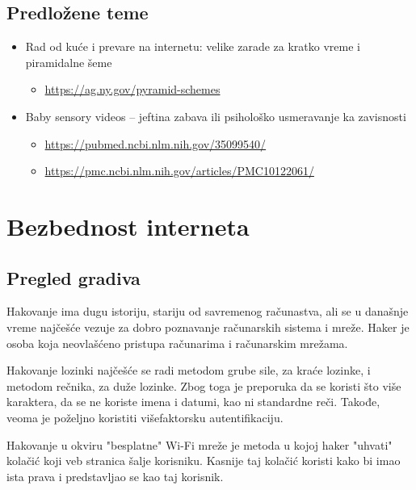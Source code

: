 \documentclass[a4paper,12pt]{article}
\begin{document}
\subsection{Predložene teme}
\begin{itemize}
    \item Rad od kuće i prevare na internetu: velike zarade za kratko vreme i piramidalne šeme
    \begin{itemize}
            \item \small{\href{https://ag.ny.gov/pyramid-schemes}{https://ag.ny.gov/pyramid-schemes}}
    \end{itemize}
    \item Baby sensory videos – jeftina zabava ili psihološko usmeravanje ka zavisnosti
    \begin{itemize}
            \item \small{\href{https://pubmed.ncbi.nlm.nih.gov/35099540/}{https://pubmed.ncbi.nlm.nih.gov/35099540/}}
            \item \small{\href{https://pmc.ncbi.nlm.nih.gov/articles/PMC10122061/}{https://pmc.ncbi.nlm.nih.gov/articles/PMC10122061/}}
    \end{itemize}
    
\end{itemize}

\section{Bezbednost interneta}
\subsection{Pregled gradiva}

Hakovanje ima dugu istoriju, stariju od savremenog računastva, ali se u današnje vreme najčešće vezuje za dobro poznavanje računarskih sistema i mreže. Haker je osoba koja neovlašćeno pristupa računarima i računarskim mrežama. 

Hakovanje lozinki najčešće se radi metodom grube sile, za kraće lozinke, i metodom rečnika, za duže lozinke. Zbog toga je preporuka da se koristi što više karaktera, da se ne koriste imena i datumi, kao ni standardne reči. Takođe, veoma je poželjno koristiti višefaktorsku autentifikaciju. 

Hakovanje u okviru "besplatne" Wi-Fi mreže je metoda u kojoj haker "uhvati" kolačić koji veb stranica šalje korisniku. Kasnije taj kolačić koristi kako bi imao ista prava i predstavljao se kao taj korisnik. 
\end{document}
